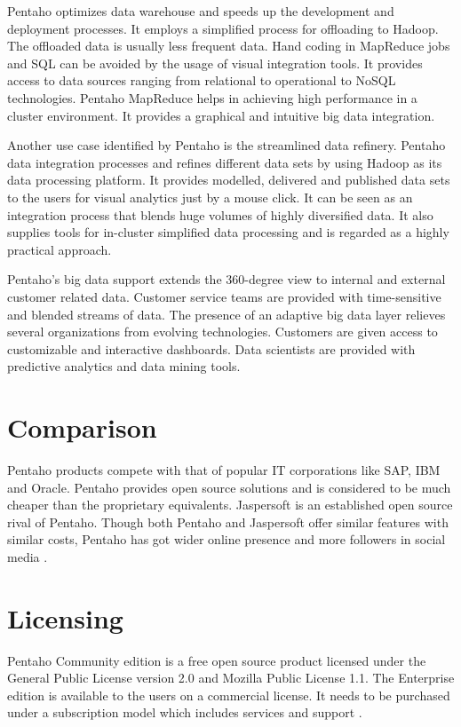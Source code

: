 \documentclass[9pt,twocolumn,twoside]{../../styles/osajnl}
\begin{document}
Pentaho optimizes data warehouse and speeds up the development and
deployment processes. It employs a simplified process for offloading
to Hadoop. The offloaded data is usually less frequent data. Hand
coding in MapReduce jobs and SQL can be avoided by the usage of visual
integration tools. It provides access to data sources ranging from
relational to operational to NoSQL technologies. Pentaho MapReduce
helps in achieving high performance in a cluster environment. It
provides a graphical and intuitive big data integration.

Another use case identified by Pentaho is the streamlined data
refinery. Pentaho data integration processes and refines different
data sets by using Hadoop as its data processing platform. It provides
modelled, delivered and published data sets to the users for visual
analytics just by a mouse click. It can be seen as an integration
process that blends huge volumes of highly diversified data. It also
supplies tools for in-cluster simplified data processing and is
regarded as a highly practical approach.

Pentaho’s big data support extends the 360-degree view to internal and
external customer related data. Customer service teams are provided
with time-sensitive and blended streams of data. The presence of an
adaptive big data layer relieves several organizations from evolving
technologies. Customers are given access to customizable and
interactive dashboards. Data scientists are provided with predictive
analytics and data mining tools.

\section{Comparison}

Pentaho products compete with that of popular IT corporations like
SAP, IBM and Oracle. Pentaho provides open source solutions and is
considered to be much cheaper than the proprietary
equivalents. Jaspersoft is an established open source rival of
Pentaho. Though both Pentaho and Jaspersoft offer similar features
with similar costs, Pentaho has got wider online presence and more
followers in social media \cite{pentaho-comparison}.

\section{Licensing}

Pentaho Community edition is a free open source product licensed under
the General Public License version 2.0 and Mozilla Public License
1.1. The Enterprise edition is available to the users on a commercial
license. It needs to be purchased under a subscription model which
includes services and support \cite{pentaho_wikipedia}.
\end{document}
